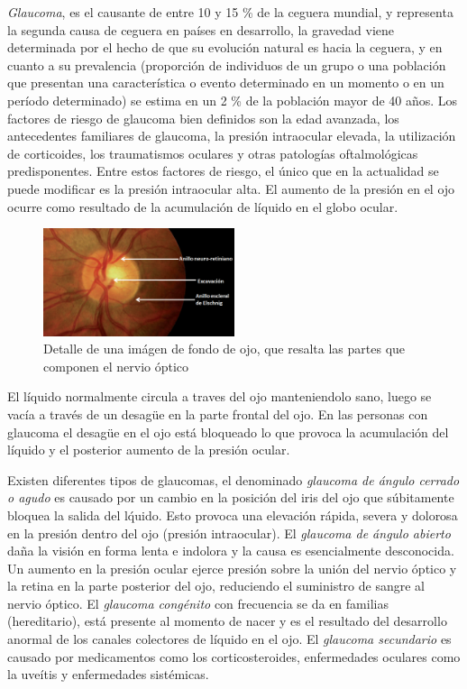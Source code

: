 \textit{Glaucoma}, es el causante de entre 10 y 15 \% de la ceguera mundial, y representa la segunda causa de ceguera en pa\'ises en desarrollo, la gravedad viene determinada por el hecho de que su evoluci\'on natural es hacia la ceguera, y en cuanto a su prevalencia (proporci\'on de individuos de un grupo o una poblaci\'on que presentan una caracter\'istica o evento determinado en un momento o en un per\'iodo determinado) se estima en un 2 \% de la poblaci\'on mayor de 40 a\~nos. Los factores de riesgo de glaucoma bien definidos son la edad avanzada, los antecedentes familiares de glaucoma, la presi\'on intraocular elevada, la utilizaci\'on de corticoides, los traumatismos oculares y otras patolog\'ias oftalmol\'ogicas predisponentes. Entre estos factores de riesgo, el \'unico que en la actualidad se puede modificar es la presi\'on intraocular alta. El aumento de la presi\'on en el ojo ocurre como resultado de la acumulaci\'on de l\'iquido en el globo ocular. \cite{jaffe2004optical}

\begin{figure}[H]
	{
	\centering
	\includegraphics[width=0.5\textwidth]{Figures/nervioOptico}
	\caption[Glaucoma]{Detalle de una im\'agen de fondo de ojo, que resalta las partes que componen el nervio \'optico}
	\label{fig:Glaucoma}
	}
\end{figure}
El l\'iquido normalmente circula a traves del ojo manteniendolo sano, luego se vac\'ia a trav\'es de un desagüe en la parte frontal del ojo. En las personas con glaucoma el desagüe en el ojo est\'a bloqueado lo que provoca la acumulaci\'on del l\'iquido y el posterior aumento de la presi\'on ocular. 

Existen diferentes tipos de glaucomas, el denominado \textit{glaucoma de \'angulo cerrado o agudo} es causado por un cambio en la posici\'on del iris del ojo que s\'ubitamente bloquea la salida del l\'quido. Esto provoca una elevaci\'on r\'apida, severa y dolorosa en la presi\'on dentro del ojo (presi\'on intraocular). El \textit{glaucoma de \'angulo abierto} da\~na la visi\'on en forma lenta e indolora y la causa es esencialmente desconocida. Un aumento en la presi\'on ocular ejerce presi\'on sobre la uni\'on del nervio \'optico y la retina en la parte posterior del ojo, reduciendo el suministro de sangre al nervio \'optico. El \textit{glaucoma cong\'enito} con frecuencia se da en familias (hereditario), est\'a presente al momento de nacer y es el resultado del desarrollo anormal de los canales colectores de l\'iquido en el ojo. El \textit{glaucoma secundario} es causado por medicamentos como los corticosteroides, enfermedades oculares como la uve\'itis y enfermedades sist\'emicas. \cite{tielsch1991population}

